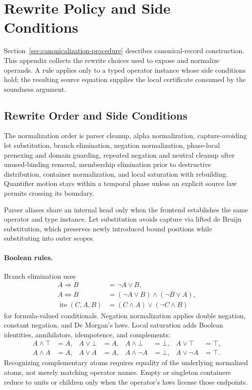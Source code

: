 \section{Rewrite Policy and Side Conditions}
\label{app:canon-rules}

Section~\ref{sec:canonicalization-procedure} describes canonical-record
construction. This appendix collects the rewrite choices used to expose and
normalize operands. A rule applies only to a typed operator instance whose side
conditions hold; the resulting source equation supplies the local certificate
consumed by the soundness argument.

\subsection{Rewrite Order and Side Conditions}
\label{app:rule-order}

The normalization order is parser cleanup, alpha normalization,
capture-avoiding let substitution, branch elimination, negation normalization,
phase-local prenexing and domain guarding, repeated negation and neutral
cleanup after unused-binding removal, membership elimination prior to
destructive distribution, container normalization, and local saturation with
rebuilding. Quantifier motion stays within a temporal phase unless an explicit
source law permits crossing its boundary.

Parser aliases share an internal head only when the frontend establishes the
same operator and type instance. Let substitution avoids capture via lifted de
Bruijn substitution, which preserves newly introduced bound positions while
substituting into outer scopes.

\paragraph{Boolean rules.}
Branch elimination uses
\begin{align*}
 A\Rightarrow B&=\neg A\lor B,\\
 A\Leftrightarrow B&=(\neg A\lor B)\land(\neg B\lor A),\\
 \operatorname{ite}(C,A,B)&=(C\land A)\lor(\neg C\land B)
\end{align*}
for formula-valued conditionals. Negation normalization applies double
negation, constant negation, and De Morgan's laws. Local saturation adds
Boolean identities, annihilators, idempotence, and complements:
\begin{align*}
 A\land\top&=A,& A\lor\bot&=A,&
 A\land\bot&=\bot,& A\lor\top&=\top,\\
 A\land A&=A,& A\lor A&=A,&
 A\land\neg A&=\bot,& A\lor\neg A&=\top.
\end{align*}
Recognizing complementary atoms requires equality of the underlying normalized
atoms, not merely matching operator names. Empty or singleton containers reduce
to units or children only when the operator's laws license those endpoints.

